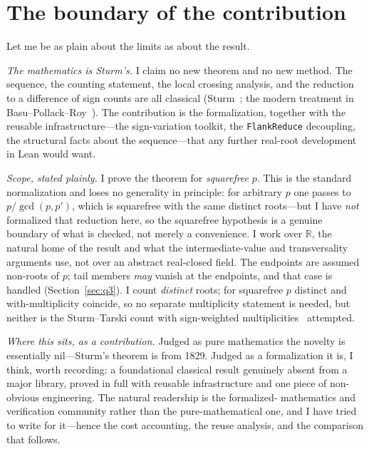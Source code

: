 \documentclass[11pt]{article}
\newcommand{\lean}[1]{\texttt{#1}}
\newcommand{\R}{\mathbb{R}}
\begin{document}
\section{The boundary of the contribution}\label{sec:boundary}

Let me be as plain about the limits as about the result.

\emph{The mathematics is Sturm's.} I claim no new theorem and no new method. The sequence, the
counting statement, the local crossing analysis, and the reduction to a difference of sign counts
are all classical (Sturm~\cite{sturm}; the modern treatment in Basu--Pollack--Roy~\cite{bpr}). The
contribution is the formalization, together with the reusable infrastructure---the sign-variation
toolkit, the \lean{FlankReduce} decoupling, the structural facts about the sequence---that any
further real-root development in Lean would want.

\emph{Scope, stated plainly.} I prove the theorem for \emph{squarefree} $p$. This is the standard
normalization and loses no generality in principle: for arbitrary $p$ one passes to
$p/\gcd(p,p')$, which is squarefree with the same distinct roots---but I have \emph{not} formalized
that reduction here, so the squarefree hypothesis is a genuine boundary of what is checked, not
merely a convenience. I work over $\R$, the natural home of the result and what the
intermediate-value and transversality arguments use, not over an abstract real-closed field. The
endpoints are assumed non-roots of $p$; tail members \emph{may} vanish at the endpoints, and that
case is handled (Section~\ref{sec:q3}). I count \emph{distinct} roots; for squarefree $p$ distinct
and with-multiplicity coincide, so no separate multiplicity statement is needed, but neither is the
Sturm--Tarski count with sign-weighted multiplicities~\cite{litarski,libudan} attempted.

\emph{Where this sits, as a contribution.} Judged as pure mathematics the novelty is essentially
nil---Sturm's theorem is from 1829. Judged as a formalization it is, I think, worth recording: a
foundational classical result genuinely absent from a major library, proved in full with reusable
infrastructure and one piece of non-obvious engineering. The natural readership is the formalized-
mathematics and verification community rather than the pure-mathematical one, and I have tried to
write for it---hence the cost accounting, the reuse analysis, and the comparison that follows.
\end{document}
